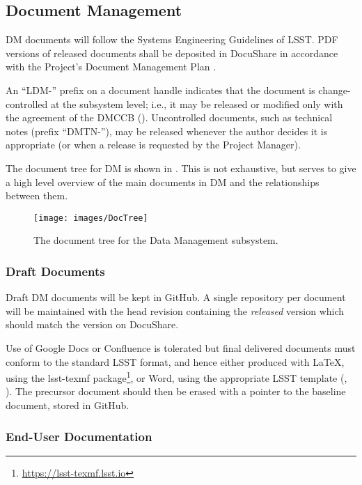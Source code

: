 \subsection {Document Management} \label{sect:docman}

DM documents will follow the \gls{Systems Engineering} Guidelines of \gls{LSST}. \gls{PDF} versions of released documents shall be deposited in \gls{DocuShare} in accordance with the Project's \gls{Document} Management Plan .

An ``LDM-'' prefix on a document handle indicates that the document is change-controlled at the subsystem level; i.e., it may be released or modified only with the agreement of the DMCCB (). Uncontrolled documents, such as technical notes (prefix ``DMTN-''), may be released whenever the author decides it is appropriate (or when a release is requested by the Project Manager).

The document tree for \gls{DM} is shown in . This is not exhaustive, but serves to give a high level overview of the main documents in \gls{DM} and the relationships between them.

\begin{figure}
\begin{center}
 \texttt{[image: images/DocTree]}
\caption{The document tree for the \gls{Data Management} subsystem.\label{fig:doctree}}
\end{center}
\end{figure}

\subsubsection{Draft Documents}

Draft \gls{DM} documents will be kept in GitHub. A single repository per document will be maintained with the head revision containing the \emph{released} version which should match the version on \gls{DocuShare}.

Use of Google Docs or Confluence is tolerated but final delivered documents must conform to the standard \gls{LSST} format, and hence either produced with \gls{LaTeX}, using the lsst-texmf package\footnote{\url{https://lsst-texmf.lsst.io}}, or Word, using the appropriate \gls{LSST} template (, ). The precursor document should then be erased with a pointer to the baseline document, stored in GitHub.

\subsubsection{End-User Documentation}

